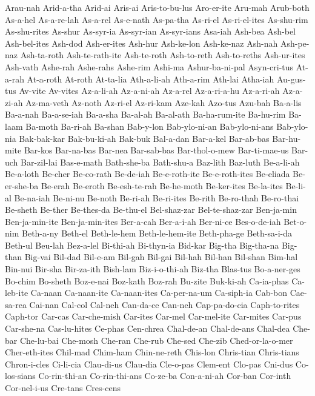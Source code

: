 {  Arau-nah Arid-a-tha Arid-ai Aris-ai Aris-to-bu-lus Aro-er-ite
  Aru-mah Arub-both As-a-hel As-a-re-lah As-a-rel As-e-nath
  As-pa-tha As-ri-el As-ri-el-ites As-shu-rim As-shu-rites As-shur
  As-syr-ia As-syr-ian As-syr-ians Asa-iah Ash-bea Ash-bel
  Ash-bel-ites Ash-dod Ash-er-ites Ash-hur Ash-ke-lon Ash-ke-naz
  Ash-nah Ash-pe-naz Ash-ta-roth Ash-te-rath-ite Ash-te-roth Ash-to-reth
  Ash-to-reths Ash-ur-ites Ash-vath Ashe-rah Ashe-rahs Ashe-rim
  Ashi-ma Ashur-ba-ni-pal Asyn-cri-tus At-a-rah At-a-roth At-roth
  At-ta-lia Ath-a-li-ah Ath-a-rim Ath-lai Atha-iah Au-gus-tus
  Av-vite Av-vites Az-a-li-ah Az-a-ni-ah Az-a-rel Az-a-ri-a-hu
  Az-a-ri-ah Az-a-zi-ah Az-ma-veth Az-noth Az-ri-el Az-ri-kam
  Aze-kah Azo-tus Azu-bah Ba-a-lis Ba-a-nah Ba-a-se-iah
  Ba-a-sha Ba-al-ah Ba-al-ath Ba-ha-rum-ite Ba-hu-rim Ba-laam
  Ba-moth Ba-ri-ah Ba-shan Bab-y-lon Bab-ylo-ni-an Bab-ylo-ni-ans
  Bab-ylo-nia Bak-bak-kar Bak-bu-ki-ah Bak-buk Bal-a-dan Bar-a-kel
  Bar-ab-bas Bar-hu-mite Bar-kos Bar-na-bas Bar-nea Bar-sab-bas
  Bar-thol-o-mew Bar-ti-mae-us Bar-uch Bar-zil-lai Bas-e-math Bath-she-ba
  Bath-shu-a Baz-lith Baz-luth Be-a-li-ah Be-a-loth Be-cher
  Be-co-rath Be-de-iah Be-e-roth-ite Be-e-roth-ites Be-eliada Be-er-she-ba
  Be-erah Be-eroth Be-esh-te-rah Be-he-moth Be-ker-ites Be-la-ites
  Be-li-al Be-na-iah Be-ni-nu Be-noth Be-ri-ah Be-ri-ites
  Be-rith Be-ro-thah Be-ro-thai Be-sheth Be-ther Be-thes-da
  Be-thu-el Bel-shaz-zar Bel-te-shaz-zar Ben-ja-min Ben-ja-min-ite Ben-ja-min-ites
  Ber-a-cah Ber-a-i-ah Ber-ni-ce Bes-o-de-iah Bet-o-nim Beth-a-ny
  Beth-el Beth-le-hem Beth-le-hem-ite Beth-pha-ge Beth-sa-i-da Beth-ul
  Beu-lah Bez-a-lel Bi-thi-ah Bi-thyn-ia Bid-kar Big-tha
  Big-tha-na Big-than Big-vai Bil-dad Bil-e-am Bil-gah
  Bil-gai Bil-hah Bil-han Bil-shan Bim-hal Bin-nui
  Bir-sha Bir-za-ith Bish-lam Biz-i-o-thi-ah Biz-tha Blas-tus
  Bo-a-ner-ges Bo-chim Bo-sheth Boz-e-nai Boz-kath Boz-rah
  Bu-zite Buk-ki-ah Ca-ia-phas Ca-leb-ite Ca-naan Ca-naan-ite
  Ca-naan-ites Ca-per-na-um Ca-siph-ia Cab-bon Cae-sa-rea Cai-nan
  Cal-col Cal-neh Can-da-ce Can-neh Cap-pa-do-cia Caph-to-rites
  Caph-tor Car-cas Car-che-mish Car-ites Car-mel Car-mel-ite
  Car-mites Car-pus Car-she-na Cas-lu-hites Ce-phas Cen-chrea
  Chal-de-an Chal-de-ans Chal-dea Che-bar Che-lu-bai Che-mosh
  Che-ran Che-rub Che-sed Che-zib Ched-or-la-o-mer Cher-eth-ites
  Chil-mad Chim-ham Chin-ne-reth Chis-lon Chris-tian Chris-tians
  Chron-i-cles Ci-li-cia Clau-di-us Clau-dia Cle-o-pas Clem-ent
  Clo-pas Cni-dus Co-los-sians Co-rin-thi-an Co-rin-thi-ans Co-ze-ba
  Con-a-ni-ah Cor-ban Cor-inth Cor-nel-i-us Cre-tans Cres-cens
}

